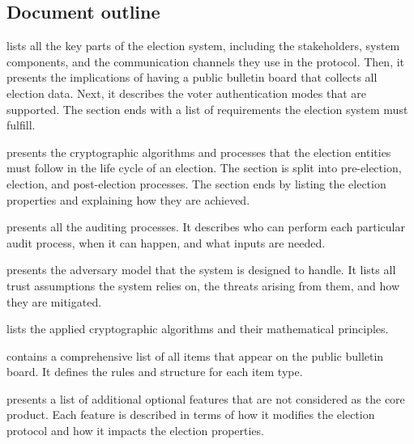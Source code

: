 \subsection{Document outline}
 lists all the key parts of the election system, including the stakeholders, system components, and the communication channels they use in the protocol. Then, it presents the implications of having a public bulletin board that collects all election data. Next, it describes the voter authentication modes that are supported. The section ends with a list of requirements the election system must fulfill.

 presents the cryptographic algorithms and processes that the election entities must follow in the life cycle of an election. The section is split into pre-election, election, and post-election processes. The section ends by listing the election properties and explaining how they are achieved.

 presents all the auditing processes. It describes who can perform each particular audit process, when it can happen, and what inputs are needed.

 presents the adversary model that the system is designed to handle. It lists all trust assumptions the system relies on, the threats arising from them, and how they are mitigated.

 lists the applied cryptographic algorithms and their mathematical principles.

 contains a comprehensive list of all items that appear on the public bulletin board. It defines the rules and structure for each item type.

 presents a list of additional optional features that are not considered as the core product. Each feature is described in terms of how it modifies the election protocol and how it impacts the election properties.
